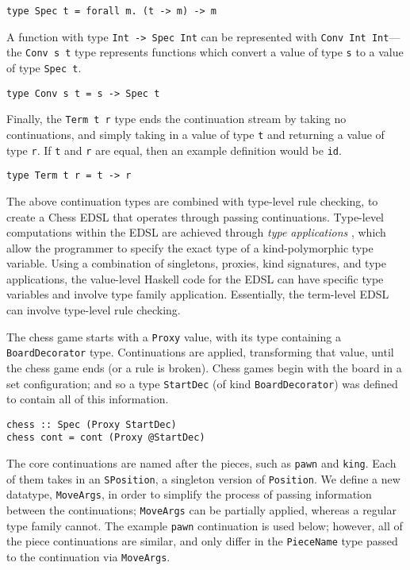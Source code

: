 \documentclass[12pt, a4paper, bibliography=totocnumbered]{scrartcl}
\begin{document}
\begin{lstlisting}
type Spec t = forall m. (t -> m) -> m
\end{lstlisting}

A function with type \lstinline{Int -> Spec Int} can be represented with \lstinline{Conv Int Int}---the \lstinline{Conv s t} type represents functions which convert a value of type \lstinline{s} to a value of type \lstinline{Spec t}.

\begin{lstlisting}
type Conv s t = s -> Spec t
\end{lstlisting}

Finally, the \lstinline{Term t r} type ends the continuation stream by taking no continuations, and simply taking in a value of type \lstinline{t} and returning a value of type \lstinline{r}. If \lstinline{t} and \lstinline{r} are equal, then an example definition would be \lstinline{id}.

\begin{lstlisting}
type Term t r = t -> r
\end{lstlisting}

The above continuation types are combined with type-level rule checking, to create a Chess EDSL that operates through passing continuations. Type-level computations within the EDSL are achieved through \emph{type applications} \cite{typeapplication}, which allow the programmer to specify the exact type of a kind-polymorphic type variable. Using a combination of singletons, proxies, kind signatures, and type applications, the value-level Haskell code for the EDSL can have specific type variables and involve type family application. Essentially, the term-level EDSL can involve type-level rule checking.

The chess game starts with a \lstinline{Proxy} value, with its type containing a \lstinline{BoardDecorator} type. Continuations are applied, transforming that value, until the chess game ends (or a rule is broken). Chess games begin with the board in a set configuration; and so a type \lstinline{StartDec} (of kind \lstinline{BoardDecorator}) was defined to contain all of this information.

\begin{lstlisting}
chess :: Spec (Proxy StartDec)
chess cont = cont (Proxy @StartDec)
\end{lstlisting}

The core continuations are named after the pieces, such as \lstinline{pawn} and \lstinline{king}. Each of them takes in an \lstinline{SPosition}, a singleton version of \lstinline{Position}. We define a new datatype, \lstinline{MoveArgs}, in order to simplify the process of passing information between the continuations; \lstinline{MoveArgs} can be partially applied, whereas a regular type family cannot. The example \lstinline{pawn} continuation is used below; however, all of the piece continuations are similar, and only differ in the \lstinline{PieceName} type passed to the continuation via \lstinline{MoveArgs}.
\end{document}
